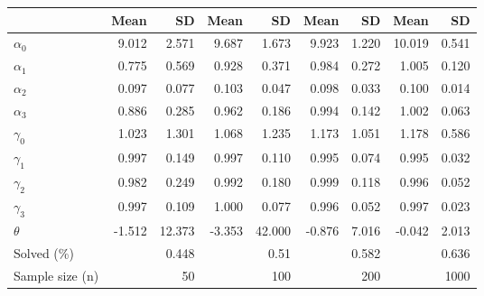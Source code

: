 
\begin{tabular}[t]{lrrrrrrrr}
\toprule
  & Mean & SD & Mean  & SD  & Mean   & SD   & Mean    & SD   \\
\midrule
$\alpha_{0}$ & 9.012 & 2.571 & 9.687 & 1.673 & 9.923 & 1.220 & 10.019 & 0.541\\
$\alpha_{1}$ & 0.775 & 0.569 & 0.928 & 0.371 & 0.984 & 0.272 & 1.005 & 0.120\\
$\alpha_{2}$ & 0.097 & 0.077 & 0.103 & 0.047 & 0.098 & 0.033 & 0.100 & 0.014\\
$\alpha_{3}$ & 0.886 & 0.285 & 0.962 & 0.186 & 0.994 & 0.142 & 1.002 & 0.063\\
$\gamma_{0}$ & 1.023 & 1.301 & 1.068 & 1.235 & 1.173 & 1.051 & 1.178 & 0.586\\
$\gamma_{1}$ & 0.997 & 0.149 & 0.997 & 0.110 & 0.995 & 0.074 & 0.995 & 0.032\\
$\gamma_{2}$ & 0.982 & 0.249 & 0.992 & 0.180 & 0.999 & 0.118 & 0.996 & 0.052\\
$\gamma_{3}$ & 0.997 & 0.109 & 1.000 & 0.077 & 0.996 & 0.052 & 0.997 & 0.023\\
$\theta$ & -1.512 & 12.373 & -3.353 & 42.000 & -0.876 & 7.016 & -0.042 & 2.013\\
Solved (\%) &  & 0.448 &  & 0.51 &  & 0.582 &  & 0.636\\
Sample size (n) &  & 50 &  & 100 &  & 200 &  & 1000\\
\bottomrule
\end{tabular}
